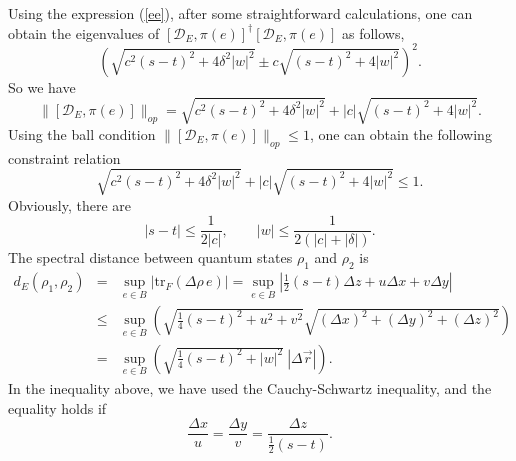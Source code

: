 \documentclass[a4paper,12pt]{article}
\begin{document}
Using the expression (\ref{ee}), after some straightforward calculations, one can obtain the eigenvalues of $[ \mathcal{D}_{E}, \pi(e) ]^{\dagger} [ \mathcal{D}_{E}, \pi(e) ]$ as follows,
\begin{equation}
	\left( \sqrt{c^2 (s - t)^2 + 4 \delta^2 |w|^2} \pm c \sqrt{(s - t)^2 + 4
		|w|^2}  \right)^2.
\end{equation}
So we have
\begin{equation}
	\| [ \mathcal{D}_{E}, \pi(e) ] \|_{op} 
	= \sqrt{c^2 (s - t)^2 + 4 \delta^2 |w|^2} + |c| \sqrt{(s - t)^2 + 4|w|^2}.
\end{equation}
Using the ball condition $\| [ \mathcal{D}_{E}, \pi(e) ] \|_{op} \leqslant 1$, one can obtain the following constraint relation
\begin{equation}\label{wst1}
	\sqrt{c^2 (s - t)^2 + 4 \delta^2 |w|^2} + |c| \sqrt{(s - t)^2 + 4|w|^2}\leqslant 1.
\end{equation}
Obviously, there are
\begin{equation}\label{stw}
	|s - t|\leqslant \frac{1}{2|c|}, \qquad |w|\leqslant\frac{1}{2(|c|+|\delta|)}.
\end{equation}
The spectral distance between quantum states $\rho_1$ and $\rho_2$ is
\begin{eqnarray}
	d_E(\rho_1, \rho_2)&=&\sup_{e\in B}|\mathrm{tr}_{F}(\Delta\rho\, e)|
	=\sup_{e\in B}\left|\frac{1}{2}(s-t)\Delta z+u\Delta x+v\Delta y\right|\nonumber\\
	&\leqslant& \sup_{e \in B}\left(\sqrt{\frac{1}{4}(s-t)^{2} +u^{2}+v^{2}   } \sqrt{(\Delta x)^2 + (\Delta y)^2+(\Delta z)^2}\right)\nonumber\\
	&=&\sup_{e \in B}\left(\sqrt{\frac{1}{4}(s-t)^{2} +\left | w  \right |^{2}     }\  |\Delta\vec{r}|\right).
\end{eqnarray}
In the inequality above, we have used the Cauchy-Schwartz inequality,
and the equality holds if
\begin{equation}\label{uvst}
	\frac{\Delta x}{u}=\frac{\Delta y}{v}=\frac{\Delta z}{\frac{1}{2}(s - t)}.
\end{equation}
\end{document}
